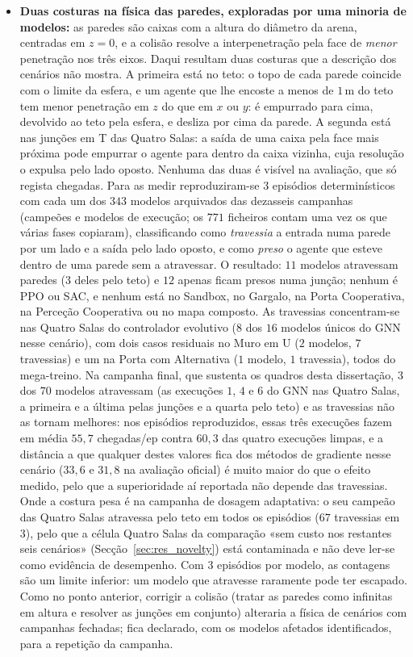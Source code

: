 \documentclass[12pt,reqno, twoside]{amsbook}
\theoremstyle{plain}
\numberwithin{equation}{chapter}
\numberwithin{section}{chapter}
\numberwithin{table}{chapter}
\numberwithin{figure}{chapter}
\begin{document}
\begin{itemize}
    \item \textbf{Duas costuras na física das paredes, exploradas por uma minoria de modelos:} as paredes são caixas com a altura do diâmetro da arena, centradas em $z=0$, e a colisão resolve a interpenetração pela face de \emph{menor} penetração nos três eixos. Daqui resultam duas costuras que a descrição dos cenários não mostra. A primeira está no teto: o topo de cada parede coincide com o limite da esfera, e um agente que lhe encoste a menos de $1$\,m do teto tem menor penetração em $z$ do que em $x$ ou $y$: é empurrado para cima, devolvido ao teto pela esfera, e desliza por cima da parede. A segunda está nas junções em T das Quatro Salas: a saída de uma caixa pela face mais próxima pode empurrar o agente para dentro da caixa vizinha, cuja resolução o expulsa pelo lado oposto. Nenhuma das duas é visível na avaliação, que só regista chegadas. Para as medir reproduziram-se $3$ episódios determinísticos com cada um dos $343$ modelos arquivados das dezasseis campanhas (campeões e modelos de execução; os $771$ ficheiros contam uma vez os que várias fases copiaram), classificando como \emph{travessia} a entrada numa parede por um lado e a saída pelo lado oposto, e como \emph{preso} o agente que esteve dentro de uma parede sem a atravessar. O resultado: $11$ modelos atravessam paredes ($3$ deles pelo teto) e $12$ apenas ficam presos numa junção; nenhum é PPO ou SAC, e nenhum está no Sandbox, no Gargalo, na Porta Cooperativa, na Perceção Cooperativa ou no mapa composto. As travessias concentram-se nas Quatro Salas do controlador evolutivo ($8$ dos $16$ modelos únicos do GNN nesse cenário), com dois casos residuais no Muro em U ($2$ modelos, $7$ travessias) e um na Porta com Alternativa ($1$ modelo, $1$ travessia), todos do mega-treino. Na campanha final, que sustenta os quadros desta dissertação, $3$ dos $70$ modelos atravessam (as execuções $1$, $4$ e $6$ do GNN nas Quatro Salas, a primeira e a última pelas junções e a quarta pelo teto) e as travessias não as tornam melhores: nos episódios reproduzidos, essas três execuções fazem em média $55{,}7$ chegadas/ep contra $60{,}3$ das quatro execuções limpas, e a distância a que qualquer destes valores fica dos métodos de gradiente nesse cenário ($33{,}6$ e $31{,}8$ na avaliação oficial) é muito maior do que o efeito medido, pelo que a superioridade aí reportada não depende das travessias. Onde a costura pesa é na campanha de dosagem adaptativa: o seu campeão das Quatro Salas atravessa pelo teto em todos os episódios ($67$ travessias em $3$), pelo que a célula Quatro Salas da comparação «sem custo nos restantes seis cenários» (Secção~\ref{sec:res_novelty}) está contaminada e não deve ler-se como evidência de desempenho. Com $3$ episódios por modelo, as contagens são um limite inferior: um modelo que atravesse raramente pode ter escapado. Como no ponto anterior, corrigir a colisão (tratar as paredes como infinitas em altura e resolver as junções em conjunto) alteraria a física de cenários com campanhas fechadas; fica declarado, com os modelos afetados identificados, para a repetição da campanha.

\end{itemize}
\end{document}
